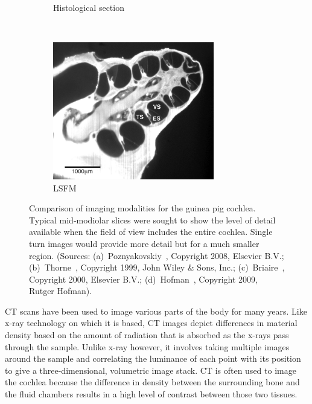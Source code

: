 \begin{figure}[p]
\begin{subfigure}[t]{0.46\textwidth}
        \caption{Histological section}
		\label{fig:histo_gp}
    \end{subfigure}%
    ~~~~
    \begin{subfigure}[t]{0.46\textwidth}
        \centering
        \includegraphics[height=6cm]{Methodology/opfos_gp_hofman}
        \caption{LSFM}
        \label{fig:opfos_gp}
    \end{subfigure}%
    
	\caption[Comparison of imaging modalities for the guinea pig
	cochlea]{Comparison of imaging modalities for the guinea pig cochlea. Typical
	mid-modiolar slices were sought to show the level of detail available when the
	field of view includes the entire cochlea. Single turn images would provide
	more detail but for a much smaller region. (Sources:
	(a)~Poznyakovskiy~\cite{poznyakovskiy2008}, Copyright \textcopyright{} 2008,
	Elsevier B.V.; (b)~Thorne~\cite{thorne1999}, Copyright \textcopyright{} 1999,
	John Wiley \& Sons, Inc.; (c)~Briaire~\cite{briaire2000mesh}, Copyright
	\textcopyright{} 2000, Elsevier B.V.; (d)~Hofman~\cite{hofman2009}, Copyright
	\textcopyright{} 2009, Rutger Hofman).}
	\label{fig:imaging_comparison_gp}
\end{figure}

CT scans have been used to image various parts of the body for many years. Like
x-ray technology on which it is based, CT images depict differences in material
density based on the amount of radiation that is absorbed as the x-rays pass
through the sample. Unlike x-ray however, it involves taking multiple images
around the sample and correlating the luminance of each point with its position
to give a three-dimensional, volumetric image stack. CT is often used to image
the cochlea because the difference in density between the surrounding bone and
the fluid chambers results in a high level of contrast between those two
tissues.

